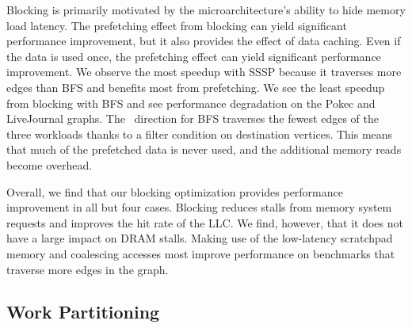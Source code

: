 Blocking is primarily motivated by the microarchitecture's ability to hide memory load latency.
The prefetching effect from blocking can yield significant performance improvement, but it also provides the effect of data caching.
Even if the data is used once, the prefetching effect can yield significant performance improvement. 
We observe the most speedup with SSSP because it traverses more edges than BFS and benefits most from prefetching.
We see the least speedup from blocking with BFS and see performance degradation on the Pokec and LiveJournal graphs.
The \pull~direction for BFS traverses the fewest edges of the three workloads thanks to a filter condition on destination vertices.
This means that much of the prefetched data is never used, and the additional memory reads become overhead.

Overall, we find that our blocking optimization provides performance improvement in all but four cases. 
Blocking reduces stalls from memory system requests and improves the hit rate of the LLC. 
We find, however, that it does not have a large impact on DRAM stalls.
Making use of the low-latency scratchpad memory and coalescing accesses most improve performance on benchmarks that traverse more edges in the graph. 
 
\subsection{Work Partitioning}

